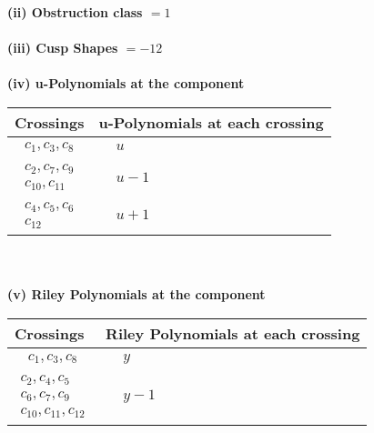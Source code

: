 \documentclass[1p]{elsarticle_modified}
\theoremstyle{definition}
\begin{document}
\flushleft \textbf{(ii) Obstruction class $= 1$}\\~\\
\flushleft \textbf{(iii) Cusp Shapes $= -12$}\\~\\
\newpage\renewcommand{\arraystretch}{1}
\flushleft \textbf{(iv) u-Polynomials at the component}\newline \\
\begin{tabular}{m{50pt}|m{274pt}}
Crossings & \hspace{64pt}u-Polynomials at each crossing \\
\hline $$\begin{aligned}c_{1},c_{3},c_{8}\end{aligned}$$&$\begin{aligned}
&u
\end{aligned}$\\
\hline $$\begin{aligned}c_{2},c_{7},c_{9}\\c_{10},c_{11}\end{aligned}$$&$\begin{aligned}
&u-1
\end{aligned}$\\
\hline $$\begin{aligned}c_{4},c_{5},c_{6}\\c_{12}\end{aligned}$$&$\begin{aligned}
&u+1
\end{aligned}$\\
\hline
\end{tabular}\\~\\
\newpage\renewcommand{\arraystretch}{1}
\flushleft \textbf{(v) Riley Polynomials at the component}\newline \\
\begin{tabular}{m{50pt}|m{274pt}}
Crossings & \hspace{64pt}Riley Polynomials at each crossing \\
\hline $$\begin{aligned}c_{1},c_{3},c_{8}\end{aligned}$$&$\begin{aligned}
&y
\end{aligned}$\\
\hline $$\begin{aligned}c_{2},c_{4},c_{5}\\c_{6},c_{7},c_{9}\\c_{10},c_{11},c_{12}\end{aligned}$$&$\begin{aligned}
&y-1
\end{aligned}$\\
\hline
\end{tabular}\\~\\
\end{document}
